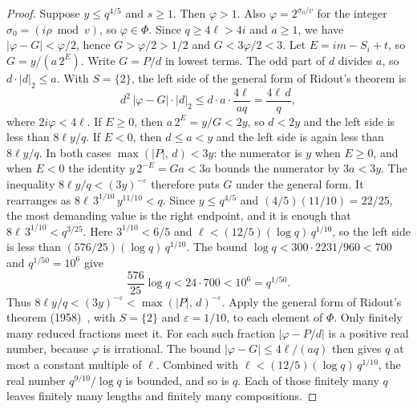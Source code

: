 \documentclass[11pt]{article}
\begin{document}
\begin{proof}
Suppose $y \le q^{4/5}$ and $s \ge 1$.
Then $\varphi > 1$.
Also $\varphi = 2^{\sigma_0/v}$ for the integer $\sigma_0 = (i\rho \bmod v)$, so $\varphi \in \Phi$.
Since $q \ge 4\ell > 4i$ and $a \ge 1$, we have $|\varphi - G| < \varphi/2$, hence $G > \varphi/2 > 1/2$ and $G < 3\varphi/2 < 3$.
Let $E = im - S_i + t$, so $G = y/(a\, 2^E)$.
Write $G = P/d$ in lowest terms.
The odd part of $d$ divides $a$, so $d \cdot |d|_2 \le a$.
With $S = \{2\}$, the left side of the general form of Ridout's theorem is
\[
d^2\, |\varphi - G| \cdot |d|_2 \le d \cdot a \cdot \frac{4\ell}{aq} = \frac{4\ell\, d}{q},
\]
where $2i\varphi < 4\ell$.
If $E \ge 0$, then $a\, 2^E = y/G < 2y$, so $d < 2y$ and the left side is less than $8\ell y/q$.
If $E < 0$, then $d \le a < y$ and the left side is again less than $8\ell y/q$.
In both cases $\max(|P|,\, d) < 3y$: the numerator is $y$ when $E \ge 0$, and when $E < 0$ the identity $y\, 2^{-E} = Ga < 3a$ bounds the numerator by $3a < 3y$.
The inequality $8\ell y/q < (3y)^{-\varepsilon}$ therefore puts $G$ under the general form.
It rearranges as $8\ell\, 3^{1/10}\, y^{11/10} < q$.
Since $y \le q^{4/5}$ and $(4/5)(11/10) = 22/25$, the most demanding value is the right endpoint, and it is enough that $8\ell\, 3^{1/10} < q^{3/25}$.
Here $3^{1/10} < 6/5$ and $\ell < (12/5)(\log q)\, q^{1/10}$, so the left side is less than $(576/25)(\log q)\, q^{1/10}$.
The bound $\log q < 300 \cdot 2231/960 < 700$ and $q^{1/50} = 10^6$ give
\[
\frac{576}{25}\log q < 24 \cdot 700 < 10^6 = q^{1/50}.
\]
Thus $8\ell y/q < (3y)^{-\varepsilon} < \max(|P|,\, d)^{-\varepsilon}$.
Apply the general form of Ridout's theorem (1958)~\cite{ridout}, with $S = \{2\}$ and $\varepsilon = 1/10$, to each element of $\Phi$.
Only finitely many reduced fractions meet it.
For each such fraction $|\varphi - P/d|$ is a positive real number, because $\varphi$ is irrational.
The bound $|\varphi - G| \le 4\ell/(aq)$ then gives $q$ at most a constant multiple of $\ell$.
Combined with $\ell < (12/5)(\log q)\, q^{1/10}$, the real number $q^{9/10}/\log q$ is bounded, and so is $q$.
Each of those finitely many $q$ leaves finitely many lengths and finitely many compositions.


\end{proof}
\end{document}
